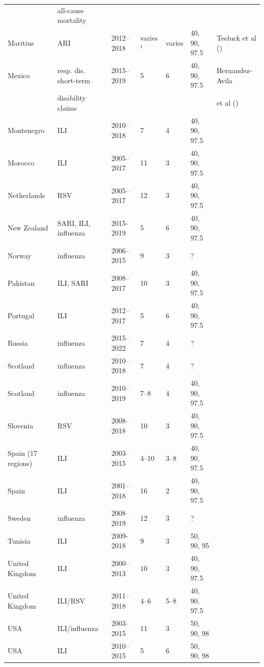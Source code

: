 \documentclass{article}
\begin{document}
\begin{table}[h!]
\begin{tabular}{l l l l l l l}
& all-cause mortality\\
Maritius & ARI & 2012--2018 & varies$^1$ & varies & 40, 90, 97.5 & Teeluck et al (\citeyear{Teeluck2021}) \\
Mexico & resp. dis. short-term& 2015--2019 & 5 & 6 & 40, 90, 97.5 & Hernandez-Avila\\
& disability claims & & & & & et al (\citeyear{HernandezAvila2022})\\
Montenegro & ILI & 2010--2018 & 7 & 4 & 40, 90, 97.5 & \cite{Rakocevic2019}\\
Morocco & ILI & 2005--2017 & 11 & 3 & 40, 90, 97.5 & \cite{Rguig2020}\\
Netherlands & RSV & 2005--2017 & 12 & 3 & 40, 90, 97.5 & \cite{Vos2019}\\
New Zealand & SARI, ILI, influenza & 2015-2019 & 5 & 6 & 40, 90, 97.5 & \cite{Wood2021}\\
Norway & influenza & 2006--2015 & 9 & 3 & ? & \cite{Benedetti2019}\\
Pakistan & ILI, SARI & 2008--2017 & 10 & 3 & 40, 90, 97.5 & \cite{Nisar2020}\\
Portugal & ILI & 2012--2017 & 5 & 6 & 40, 90, 97.5 & \cite{Pascoa2018}\\
Russia & influenza & 2015--2022 & 7 & 4 & ? & \cite{Sominina2022}\\
Scotland & influenza & 2010--2018 & 7 & 4 & ? & \cite{Murray2018}\\
Scotland & influenza & 2010--2019 & 7--8 & 4 & 40, 90, 97.5 & \cite{Dickson2020}\\
Slovenia & RSV & 2008--2018 & 10 & 3 & 40, 90, 97.5 & \cite{Grilc2021}\\
Spain (17 regions) & ILI & 2003--2015 & 4--10 & 3--8 & 40, 90, 97.5 & \cite{Bangert2017}\\
Spain & ILI & 2001--2018 & 16 & 2 & 40, 90, 97.5 & \cite{RedondoBravo2020}\\
Sweden & influenza & 2008--2019 & 12 & 3 & ? & \cite{Spreco2020}\\
Tunisia & ILI & 2009-2018 & 9 & 3 & 50, 90, 95 & \cite{Bouguerra2020}\\
United Kingdom & ILI & 2000--2013 & 10 & 3 & 40, 90, 97.5 & \cite{Green2015}\\
United Kingdom & ILI/RSV & 2011--2018 & 4--6 & 5--8 & 40, 90, 97.5 & \cite{Harcourt2019}\\
USA & ILI/influenza & 2003--2015 & 11 & 3 & 50, 90, 98 & \cite{Biggerstaff2017}\\
USA & ILI & 2010--2015 & 5 & 6 & 50, 90, 98 & \cite{Dahlgren2018}\\

\end{tabular}
\end{table}
\end{document}
